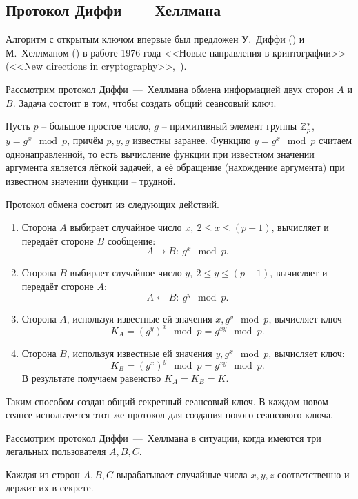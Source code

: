 \subsection{Протокол Диффи~---~Хеллмана}

Алгоритм с открытым ключом впервые был предложен У.~Диффи () и М.~Хеллманом () в работе 1976 года <<Новые направления в криптографии>> (<<New directions in cryptography>>,~\cite{Diffie:Hellman:1976}).

Рассмотрим протокол Диффи~---~Хеллмана обмена информацией двух сторон $A$ и $B$. Задача состоит в том, чтобы создать общий сеансовый ключ.

Пусть $p$ -- большое простое число, $g$ -- примитивный элемент группы $\mathbb{Z}_p^*$, ~ $y = g^x \mod p$, причём $p,y,g$ известны заранее. Функцию $y=g^{x} \mod p$ считаем однонаправленной, то есть вычисление функции при известном значении аргумента является лёгкой задачей, а её обращение (нахождение аргумента) при известном значении функции -- трудной.

Протокол обмена состоит из следующих действий.
\begin{enumerate}
    \item Сторона $A$ выбирает случайное число $x, ~ 2 \leq x \leq (p-1)$, вычисляет и передаёт стороне $B$ сообщение:
        \[ A \rightarrow B: ~ g^x \mod p. \]
    \item Сторона $B$ выбирает случайное число $y, ~ 2\leq y \leq (p-1)$, вычисляет и передаёт стороне $A$:
        \[ A \leftarrow B: ~ g^y \mod p. \]
    \item Сторона $A$, используя известные ей значения $x,g^{y} \mod p$, вычисляет ключ
        \[ K_{A} =(g^{y})^{x}\mod p=g^{xy} \mod p. \]
    \item Сторона $B$, используя известные ей значения $y,g^{x} \mod p$, вычисляет ключ:
        \[ K_{B} =(g^{x})^{y}\mod p=g^{xy}\mod p. \]
        В результате получаем равенство $K_A = K_B = K$.
\end{enumerate}

Таким способом создан общий секретный сеансовый ключ. В каждом новом сеансе используется этот же протокол для создания нового сеансового ключа.

Рассмотрим протокол Диффи~---~Хеллмана в ситуации, когда имеются три легальных пользователя $A,B,C$.

Каждая из сторон $A,B,C$ вырабатывает случайные числа $x,y,z$ соответственно и держит их в секрете.

